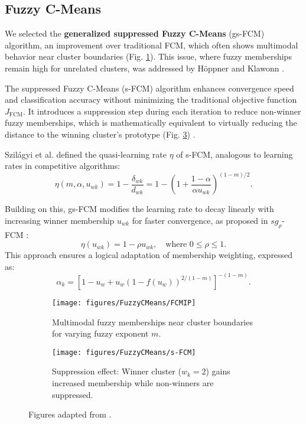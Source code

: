 \subsection{Fuzzy C-Means}

We selected the \textbf{generalized suppressed Fuzzy C-Means} (gs-FCM) algorithm, an improvement over traditional FCM, which often shows multimodal behavior near cluster boundaries (Fig. \ref{fig:FCMIP}). This issue, where fuzzy memberships remain high for unrelated clusters, was addressed by Höppner and Klawonn \cite{Hoppner2003}.

The suppressed Fuzzy C-Means (s-FCM) algorithm \cite{Fan2003} enhances convergence speed and classification accuracy without minimizing the traditional objective function \( J_{\text{FCM}} \). It introduces a suppression step during each iteration to reduce non-winner fuzzy memberships, which is mathematically equivalent to virtually reducing the distance to the winning cluster's prototype (Fig. \ref{fig:VirtualReduction}) \cite{Szilagyi2010}.

Szilágyi et al. \cite{Szilagyi2010} defined the quasi-learning rate \(\eta\) of s-FCM, analogous to learning rates in competitive algorithms:
\[
\eta(m, \alpha, u_{wk}) = 1 - \frac{\delta_{wk}}{d_{wk}} = 1 - \left( 1 + \frac{1-\alpha}{\alpha u_{wk}} \right)^{(1-m)/2}.
\]

Building on this, gs-FCM modifies the learning rate to decay linearly with increasing winner membership \(u_{wk}\) for faster convergence, as proposed in $sg_\rho$-FCM \cite{Szilagyi2014}:
\[
\eta(u_{wk}) = 1 - \rho u_{wk}, \quad \text{where } 0 \leq \rho \leq 1.
\]
This approach ensures a logical adaptation of membership weighting, expressed as:
\[
\alpha_k = \left[ 1 - u_w + u_w \left( 1 - f(u_w) \right)^{2/(1-m)} \right]^{-(1-m)}.
\]

\begin{figure}[htbp]
    \centering
    \begin{subfigure}{0.3\textwidth}
        \centering
        \texttt{[image: figures/FuzzyCMeans/FCMIP]}
        \caption{Multimodal fuzzy memberships near cluster boundaries for varying fuzzy exponent \(m\).}
        \label{fig:FCMIP}
    \end{subfigure}
    \hspace{0.15\textwidth} %
    \begin{subfigure}{0.3\textwidth}
        \centering
        \texttt{[image: figures/FuzzyCMeans/s-FCM]}
        \caption{Suppression effect: Winner cluster (\(w_k=2\)) gains increased membership while non-winners are suppressed.}
        \label{fig:VirtualReduction}
    \end{subfigure}
    \caption{Figures adapted from \cite{Szilagyi2014}.}
\end{figure}
